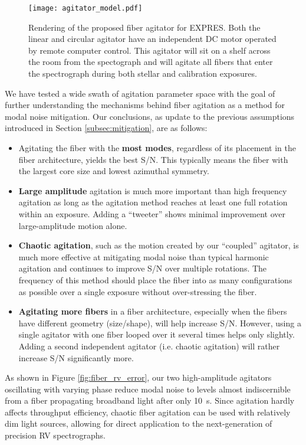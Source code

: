 \documentclass[twocolumn]{emulateapj}
\begin{document}
\begin{figure}
\centering
	\texttt{[image: agitator\_model.pdf]}
	\caption{Rendering of the proposed fiber agitator for EXPRES. Both the linear and circular agitator have an independent DC motor operated by remote computer control. This agitator will sit on a shelf across the room from the spectograph and will agitate all fibers that enter the spectrograph during both stellar and calibration exposures.}
\label{fig:agitator_model}
\end{figure}

We have tested a wide swath of agitation parameter space with the goal of further understanding the mechanisms behind fiber agitation as a method for modal noise mitigation. Our conclusions, as update to the previous assumptions introduced in Section \ref{subsec:mitigation}, are as follows:
\begin{itemize}
\item Agitating the fiber with the \textbf{most modes}, regardless of its placement in the fiber architecture, yields the best S/N. This typically means the fiber with the largest core size and lowest azimuthal symmetry.
\item \textbf{Large amplitude} agitation is much more important than high frequency agitation as long as the agitation method reaches at least one full rotation within an exposure. Adding a ``tweeter'' shows minimal improvement over large-amplitude motion alone.
\item \textbf{Chaotic agitation}, such as the motion created by our ``coupled'' agitator, is much more effective at mitigating modal noise than typical harmonic agitation and continues to improve S/N over multiple rotations. The frequency of this method should place the fiber into as many configurations as possible over a single exposure without over-stressing the fiber.
\item \textbf{Agitating more fibers} in a fiber architecture, especially when the fibers have different geometry (size/shape), will help increase S/N. However, using a single agitator with one fiber looped over it several times helps only slightly. Adding a second independent agitator (i.e. chaotic agitation) will rather increase S/N significantly more.
\end{itemize}

As shown in Figure \ref{fig:fiber_rv_error}, our two high-amplitude agitators oscillating with varying phase reduce modal noise to levels almost indiscernible from a fiber propagating broadband light after only \SI{10}{\second}. Since agitation hardly affects throughput efficiency, chaotic fiber agitation can be used with relatively dim light sources, allowing for direct application to the next-generation of precision RV spectrographs.
\end{document}
